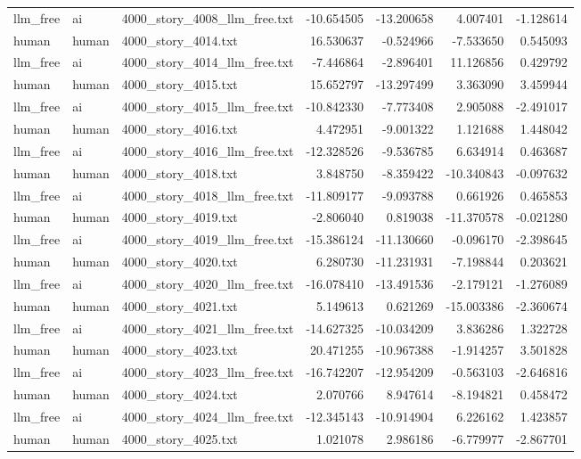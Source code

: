 \begin{longtable}{lllrrrr}
llm\_free & ai & 4000\_story\_4008\_llm\_free.txt & -10.654505 & -13.200658 & 4.007401 & -1.128614 \\
human & human & 4000\_story\_4014.txt & 16.530637 & -0.524966 & -7.533650 & 0.545093 \\
llm\_free & ai & 4000\_story\_4014\_llm\_free.txt & -7.446864 & -2.896401 & 11.126856 & 0.429792 \\
human & human & 4000\_story\_4015.txt & 15.652797 & -13.297499 & 3.363090 & 3.459944 \\
llm\_free & ai & 4000\_story\_4015\_llm\_free.txt & -10.842330 & -7.773408 & 2.905088 & -2.491017 \\
human & human & 4000\_story\_4016.txt & 4.472951 & -9.001322 & 1.121688 & 1.448042 \\
llm\_free & ai & 4000\_story\_4016\_llm\_free.txt & -12.328526 & -9.536785 & 6.634914 & 0.463687 \\
human & human & 4000\_story\_4018.txt & 3.848750 & -8.359422 & -10.340843 & -0.097632 \\
llm\_free & ai & 4000\_story\_4018\_llm\_free.txt & -11.809177 & -9.093788 & 0.661926 & 0.465853 \\
human & human & 4000\_story\_4019.txt & -2.806040 & 0.819038 & -11.370578 & -0.021280 \\
llm\_free & ai & 4000\_story\_4019\_llm\_free.txt & -15.386124 & -11.130660 & -0.096170 & -2.398645 \\
human & human & 4000\_story\_4020.txt & 6.280730 & -11.231931 & -7.198844 & 0.203621 \\
llm\_free & ai & 4000\_story\_4020\_llm\_free.txt & -16.078410 & -13.491536 & -2.179121 & -1.276089 \\
human & human & 4000\_story\_4021.txt & 5.149613 & 0.621269 & -15.003386 & -2.360674 \\
llm\_free & ai & 4000\_story\_4021\_llm\_free.txt & -14.627325 & -10.034209 & 3.836286 & 1.322728 \\
human & human & 4000\_story\_4023.txt & 20.471255 & -10.967388 & -1.914257 & 3.501828 \\
llm\_free & ai & 4000\_story\_4023\_llm\_free.txt & -16.742207 & -12.954209 & -0.563103 & -2.646816 \\
human & human & 4000\_story\_4024.txt & 2.070766 & 8.947614 & -8.194821 & 0.458472 \\
llm\_free & ai & 4000\_story\_4024\_llm\_free.txt & -12.345143 & -10.914904 & 6.226162 & 1.423857 \\
human & human & 4000\_story\_4025.txt & 1.021078 & 2.986186 & -6.779977 & -2.867701 \\

\end{longtable}
